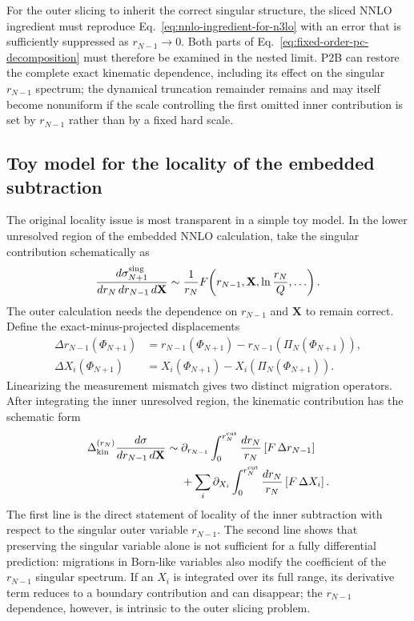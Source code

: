 \documentclass[11pt]{article}
\newcommand{\rnm}{r_{N-1}}
\newcommand{\rn}{r_N}
\newcommand{\cut}{\mathrm{cut}}
\newcommand{\Ph}{\Phi}
\begin{document}
For the outer slicing to inherit the correct singular structure, the sliced NNLO ingredient must reproduce
Eq.~\eqref{eq:nnlo-ingredient-for-n3lo} with an error that is sufficiently suppressed as $\rnm\to0$. Both
parts of Eq.~\eqref{eq:fixed-order-pc-decomposition} must therefore be examined in the nested limit. P2B can
restore the complete exact kinematic dependence, including its effect on the singular $\rnm$ spectrum; the
dynamical truncation remainder remains and may itself become nonuniform if the scale controlling the first
omitted inner contribution is set by $\rnm$ rather than by a fixed hard scale.

\subsection{Toy model for the locality of the embedded subtraction}
\label{subsec:nested-slicing-toy-model}

The original locality issue is most transparent in a simple toy model. In the lower unresolved region of
the embedded NNLO calculation, take the singular contribution schematically as
\begin{equation}
\frac{d\sigma_{N+1}^{\rm sing}}
{d\rn\,d\rnm\,d\mathbf X}
\sim
\frac{1}{\rn}
F\!\left(\rnm,\mathbf X,
\ln\frac{\rn}{Q},\ldots\right).
\label{eq:nested-toy-singular}
\end{equation}
The outer calculation needs the dependence on $\rnm$ and $\mathbf X$ to remain correct. Define the
exact-minus-projected displacements
\begin{align}
\Delta\rnm(\Ph_{N+1})
&=
\rnm(\Ph_{N+1})
-
\rnm\!\left(\Pi_N(\Ph_{N+1})\right),
\label{eq:delta-rnm}
\\
\Delta X_i(\Ph_{N+1})
&=
X_i(\Ph_{N+1})
-
X_i\!\left(\Pi_N(\Ph_{N+1})\right).
\label{eq:delta-x-lower-map}
\end{align}
Linearizing the measurement mismatch gives two distinct migration operators. After integrating the inner
unresolved region, the kinematic contribution has the schematic form
\begin{align}
\Delta_{\rm kin}^{(\rn)}
\frac{d\sigma}{d\rnm\,d\mathbf X}
\sim{}&
\partial_{\rnm}
\int_0^{\rn^{\cut}}
\frac{d\rn}{\rn}
\left[F\,\Delta\rnm\right]
\nonumber\\
&+
\sum_i
\partial_{X_i}
\int_0^{\rn^{\cut}}
\frac{d\rn}{\rn}
\left[F\,\Delta X_i\right].
\label{eq:nested-toy-kinematic-migration}
\end{align}
The first line is the direct statement of locality of the inner subtraction with respect to the singular
outer variable $\rnm$. The second line shows that preserving the singular variable alone is not sufficient
for a fully differential prediction: migrations in Born-like variables also modify the coefficient of the
$\rnm$ singular spectrum. If an $X_i$ is integrated over its full range, its derivative term reduces to a
boundary contribution and can disappear; the $\rnm$ dependence, however, is intrinsic to the outer slicing
problem.
\end{document}
